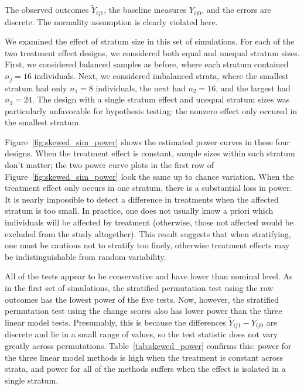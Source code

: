 \documentclass[11pt]{article}
\begin{document}
The observed outcomes $\tilde{Y}_{ij1}$, the baseline measures $Y_{ij0}$, and the errors are discrete.
The normality assumption is clearly violated here.

We examined the effect of stratum size in this set of simulations.
For each of the two treatment effect designs, we considered both equal and unequal stratum sizes.
First, we considered balanced samples as before, where each stratum contained $n_j = 16$ individuals.
Next, we considered imbalanced strata, where the smallest stratum had only $n_1=8$ individuals, the next had $n_2= 16$, and the largest had $n_3=24$.
The design with a single stratum effect and unequal stratum sizes was particularly unfavorable for hypothesis testing:
the nonzero effect only occured in the smallest stratum.

Figure~\ref{fig:skewed_sim_power} shows the estimated power curves in these four designs.
When the treatment effect is constant, sample sizes within each stratum don't matter; 
the two power curve plots in the first row of Figure~\ref{fig:skewed_sim_power} look the same up to chance variation.
When the treatment effect only occurs in one stratum, there is a substantial loss in power.
It is nearly impossible to detect a difference in treatments when the affected stratum is too small.
In practice, one does not usually know a priori which individuals will be affected by treatment (otherwise, those not affected would be excluded from the study altogether).
This result suggests that when stratifying, one must be cautious not to stratify too finely, otherwise treatment effects may be indistinguishable from random variability.

All of the tests appear to be conservative and have lower than nominal level.
As in the first set of simulations, the stratified permutation test using the raw outcomes has the lowest power of the five tests.
Now, however, the stratified permutation test using the change scores also has lower power than the three linear model tests.
Presumably, this is because the differences $\tilde{Y}_{ij1} - Y_{ij0}$ are discrete and lie in a small range of values, so the test statistic does not vary greatly across permutations.
Table~\ref{tab:skewed_power} confirms this: power for the three linear model methods is high when the treatment is constant across strata, and power for all of the methods suffers when the effect is isolated in a single stratum.
\end{document}
